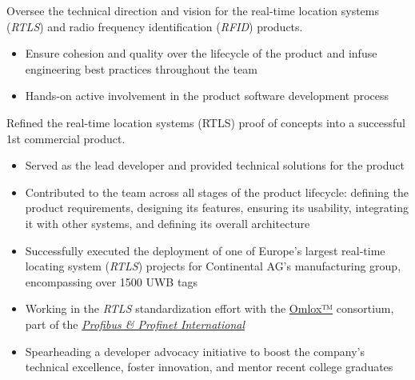 \documentclass[10pt,a4paper,ragged2e,withhyper]{altacv}
\begin{document}
\begin{paracol}{2}


Oversee the technical direction and vision for the real-time location systems (\textit{RTLS}) and radio frequency identification (\textit{RFID}) products.

\medskip

\begin{itemize}
\item Ensure cohesion and quality over the lifecycle of the product and infuse engineering best practices throughout the team
\item Hands-on active involvement in the product software development process
\end{itemize}

\divider

\smallskip


Refined the real-time location systems (RTLS) proof of concepts into a successful 1st commercial product.

\medskip

\begin{itemize}
  \item Served as the lead developer and provided technical solutions for the product
  \item Contributed to the team across all stages of the product lifecycle: defining the product requirements, designing its features, ensuring its usability, integrating it with other systems, and defining its overall architecture
  \item Successfully executed the deployment of one of Europe's largest real-time locating system (\textit{RTLS}) projects for Continental AG's manufacturing group, encompassing over 1500 UWB tags
  \item Working in the \textit{RTLS} standardization effort with the \href{https://omlox.com/}{Omlox™} consortium, part of the \href{https://www.profibus.com/technology/omlox}{\textit{Profibus \& Profinet International}}
  \item Spearheading a developer advocacy initiative to boost the company's technical excellence, foster innovation, and mentor recent college graduates
\end{itemize}


\end{paracol}
\end{document}
